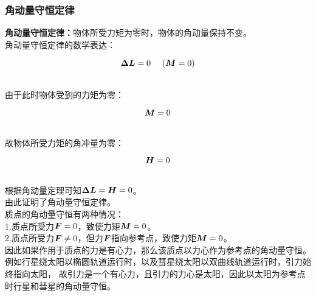 \documentclass[UTF8]{ctexart}
\newcommand*{\veb}[1]{\vb*{#1}}
\begin{document}
\subsubsection{角动量守恒定律}
    \textbf{角动量守恒定律：}物体所受力矩为零时，物体的角动量保持不变。\\[3mm]
    角动量守恒定律的数学表达：
    \begin{large}
        \begin{equation*}
            \veb{\Delta L}=0~~~~(\veb{M}=0)
        \end{equation*}
    \end{large}\\
    由于此时物体受到的力矩为零：
    \begin{large}
        \begin{equation*}
            \veb{M}=0
        \end{equation*}
    \end{large}\\
    故物体所受力矩的角冲量为零：
    \begin{large}
        \begin{equation*}
            \veb{H}=0
        \end{equation*}
    \end{large}\\
    根据角动量定理可知$\veb{\Delta L}=\veb{H}=0$。\\[3mm]
    由此证明了角动量守恒定律。\\[8mm]
    质点的角动量守恒有两种情况：\\[3mm]
    1.质点所受力$\veb{F}=0$，致使力矩$\veb{M}=0$。\\[3mm]
    2.质点所受力$\veb{F}\neq 0$，但力$\veb{F}$指向参考点，致使力矩$\veb{M}=0$。\\[4mm]
    因此如果作用于质点的力是有心力，那么该质点以力心作为参考点的角动量守恒。\\[3mm]
    例如行星绕太阳以椭圆轨道运行时，以及彗星绕太阳以双曲线轨道运行时，引力始终指向太阳，
    故引力是一个有心力，且引力的力心是太阳，因此以太阳为参考点时行星和彗星的角动量守恒。

\newpage
\end{document}
